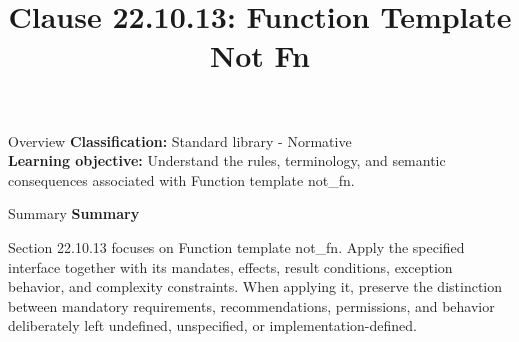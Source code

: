 \documentclass[10pt,letterpaper]{article}
\title{Clause 22.10.13: Function Template Not Fn}
\author{}
\date{}
\begin{document}
\maketitle
\begin{CornellOverviewBox}{Overview}
\textbf{Classification:} Standard library - Normative\\[2pt]
\textbf{Learning objective:} Understand the rules, terminology, and semantic consequences associated with Function template not\_fn.
\end{CornellOverviewBox}\begin{CornellSummaryBox}{Summary}
{\sffamily\bfseries\color{Accent} Summary}\par\vspace{3pt}Section 22.10.13 focuses on Function template not\_fn. Apply the specified interface together with its mandates, effects, result conditions, exception behavior, and complexity constraints. When applying it, preserve the distinction between mandatory requirements, recommendations, permissions, and behavior deliberately left undefined, unspecified, or implementation-defined.
\end{CornellSummaryBox}
\end{document}
